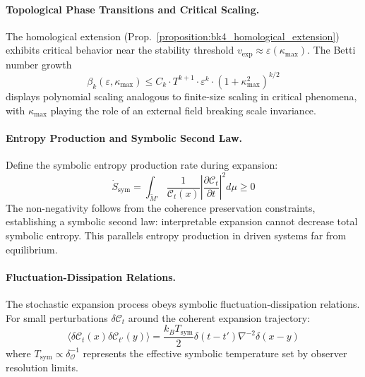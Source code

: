 \begin{demonstratio}
\paragraph{Topological Phase Transitions and Critical Scaling.}
The homological extension (Prop.~\ref{proposition:bk4_homological_extension}) exhibits critical behavior near the stability threshold $v_{\text{exp}} \approx \varepsilon(\kappa_{\max})$. The Betti number growth
\begin{equation}
\beta_k(\varepsilon,\kappa_{\max}) \leq C_k \cdot T^{k+1} \cdot \varepsilon^k \cdot (1+\kappa_{\max}^2)^{k/2}
\end{equation}
displays polynomial scaling analogous to finite-size scaling in critical phenomena, with $\kappa_{\max}$ playing the role of an external field breaking scale invariance.

\paragraph{Entropy Production and Symbolic Second Law.}
Define the symbolic entropy production rate during expansion:
\begin{equation}
\dot{S}_{\text{sym}} = \int_{\widetilde{M}'} \frac{1}{\mathcal{C}_t(x)} \left| \frac{\partial \mathcal{C}_t}{\partial t} \right|^2 d\mu \geq 0
\end{equation}
The non-negativity follows from the coherence preservation constraints, establishing a symbolic second law: interpretable expansion cannot decrease total symbolic entropy. This parallels entropy production in driven systems far from equilibrium.

\paragraph{Fluctuation-Dissipation Relations.}
The stochastic expansion process obeys symbolic fluctuation-dissipation relations. For small perturbations $\delta \mathcal{C}_t$ around the coherent expansion trajectory:
\begin{equation}
\langle \delta \mathcal{C}_t(x) \delta \mathcal{C}_{t'}(y) \rangle = \frac{k_B T_{\text{sym}}}{2} \delta(t-t') \nabla^{-2} \delta(x-y)
\end{equation}
where $T_{\text{sym}} \propto \delta_{\mathcal{O}}^{-1}$ represents the effective symbolic temperature set by observer resolution limits.


\end{demonstratio}
